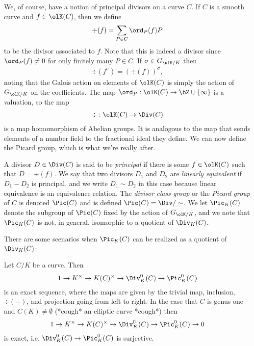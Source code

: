 We, of course, have a notion of principal divisors on a curve $C$. If  $C$ is a smooth curve and $f \in \olK(C)$, then we define
\begin{align*}
	\div(f) = \sum_{P\in C} \ord_P(f)P
\end{align*}
to be the divisor associated to $f$. Note that this is indeed a divisor since $\ord_P(f) \neq 0$ for only finitely many $P \in C$. If $\sigma \in G_{\olK/K}$ then 
\begin{align*}
	\div(f^\sigma) = (\div(f))^\sigma,
\end{align*}
noting that the Galois action on elements of $\olK(C)$ is simply the action of $G_{\olK/K}$ on the coefficients. The map $\ord_P:\olK(C)\rightarrow \bZ\cup \{\infty\}$ is a valuation, so the map
\begin{align*}
	\div:\olK(C)\to \Div(C)
\end{align*}
is a map homomorphism of Abelian groups. It is analogous to the map that sends elements of a number field to the fractional ideal they define. We can now define the Picard group, which is what we're really after.
\begin{defn}\label{defn:picard-group}
	A divisor $D \in \Div(C)$ is said to be \emph{principal} if there is some $f \in \olK(C)$ such that $D = \div(f)$. We say that two divisors $D_1$ and $D_2$ are \emph{linearly equivalent} if $D_1 - D_2$ is principal, and we write $D_1\sim D_2$ in this case because linear equivalence is an equivalence relation. The \emph{divisor class group} or the \emph{Picard group} of $C$ is denoted $\Pic(C)$ and is defined $\Pic(C) = \Div/\sim$. We let $\Pic_K(C)$ denote the subgroup of $\Pic(C)$ fixed by the action of $G_{\olK/K}$, and we note that $\Pic_K(C)$ is not, in general, isomorphic to a quotient of $\Div_K(C)$.
\end{defn}
There are some scenarios when $\Pic_K(C)$ can be realized as a quotient of $\Div_K(C)$:
\begin{example}\label{exmp:Pic_K-as-quotient-of-Div_K}
	Let $C/K$ be a curve. Then
	\begin{align*}
		1 \to K^\times \to K(C)^\times \to \Div^0_K(C) \to \Pic_K^0(C)
	\end{align*}
	is an exact sequence, where the maps are given by the trivial map, inclusion, $\div(-)$, and projection going from left to right. In the case that $C$ is genus one and $C(K) \neq \emptyset$ (*cough* an elliptic curve *cough*) then
	\begin{align*}
		1 \to K^\times \to K(C)^\times \to \Div^0_K(C) \to \Pic_K^0(C) \to 0
	\end{align*}
	is exact, i.e. $\Div^0_K(C) \to \Pic^0_K(C)$ is surjective.
\end{example}

